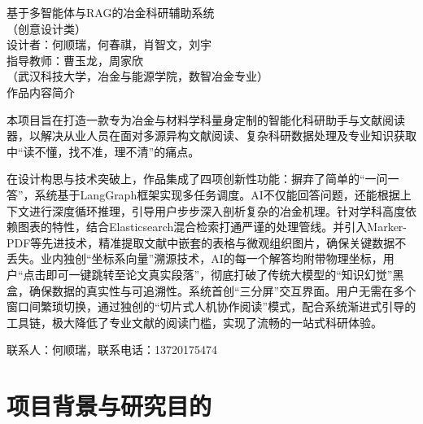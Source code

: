 \documentclass[a4paper, 12pt]{ctexart}
\newcommand{\mainformat}{\songti\zihao{-4}}
\begin{document}
\begin{center}
    {\heiti{} 基于多智能体与RAG的冶金科研辅助系统}\\[1ex]
    {\heiti{} （创意设计类）}\\[2ex]
    
    {\songti{} 设计者：何顺瑞，何春祺，肖智文，刘宇}\\[1ex]
    
    {\songti{} 指导教师：曹玉龙，周家欣}\\[1ex]
    
    {\songti{} （武汉科技大学，冶金与能源学院，数智冶金专业）}\\[3ex]
    
    {\heiti{} 作品内容简介}\\[1ex]
\end{center}

{\songti{}
本项目旨在打造一款专为冶金与材料学科量身定制的智能化科研助手与文献阅读器，以解决从业人员在面对多源异构文献阅读、复杂科研数据处理及专业知识获取中“读不懂，找不准，理不清”的痛点。

在设计构思与技术突破上，作品集成了四项创新性功能：摒弃了简单的“一问一答”，系统基于LangGraph框架实现多任务调度。AI不仅能回答问题，还能根据上下文进行深度循环推理，引导用户步步深入剖析复杂的冶金机理。针对学科高度依赖图表的特性，结合Elasticsearch混合检索打通严谨的处理管线。并引入Marker-PDF等先进技术，精准提取文献中嵌套的表格与微观组织图片，确保关键数据不丢失。业内独创“坐标系向量”溯源技术，AI的每一个解答均附带物理坐标，用户“点击即可一键跳转至论文真实段落”，彻底打破了传统大模型的“知识幻觉”黑盒，确保数据的真实性与可追溯性。系统首创“三分屏”交互界面。用户无需在多个窗口间繁琐切换，通过独创的“切片式人机协作阅读”模式，配合系统渐进式引导的工具链，极大降低了专业文献的阅读门槛，实现了流畅的一站式科研体验。

联系人：何顺瑞，联系电话：13720175474
}

\vspace{3ex}

\mainformat %

\section{项目背景与研究目的}
\end{document}
